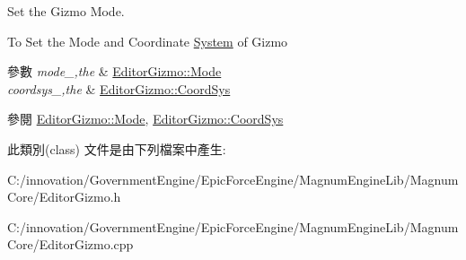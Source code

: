 Set the Gizmo Mode. 

To Set the Mode and Coordinate \hyperlink{class_i_dream_sky_1_1_system}{System} of Gizmo 
\begin{DoxyParams}{參數}
{\em mode\+\_\+,the} & \hyperlink{class_i_dream_sky_1_1_editor_gizmo_ac4d72bcb586f548ceaba02af53340394}{Editor\+Gizmo\+::\+Mode} \\
\hline
{\em coordsys\+\_\+,the} & \hyperlink{class_i_dream_sky_1_1_editor_gizmo_a907a83f34db5629458b5c1da4d13f35f}{Editor\+Gizmo\+::\+Coord\+Sys} \\
\hline
\end{DoxyParams}
\begin{DoxySeeAlso}{參閱}
\hyperlink{class_i_dream_sky_1_1_editor_gizmo_ac4d72bcb586f548ceaba02af53340394}{Editor\+Gizmo\+::\+Mode}, \hyperlink{class_i_dream_sky_1_1_editor_gizmo_a907a83f34db5629458b5c1da4d13f35f}{Editor\+Gizmo\+::\+Coord\+Sys} 
\end{DoxySeeAlso}


此類別(class) 文件是由下列檔案中產生\+:\begin{DoxyCompactItemize}
\item 
C\+:/innovation/\+Government\+Engine/\+Epic\+Force\+Engine/\+Magnum\+Engine\+Lib/\+Magnum\+Core/Editor\+Gizmo.\+h\item 
C\+:/innovation/\+Government\+Engine/\+Epic\+Force\+Engine/\+Magnum\+Engine\+Lib/\+Magnum\+Core/Editor\+Gizmo.\+cpp\end{DoxyCompactItemize}
